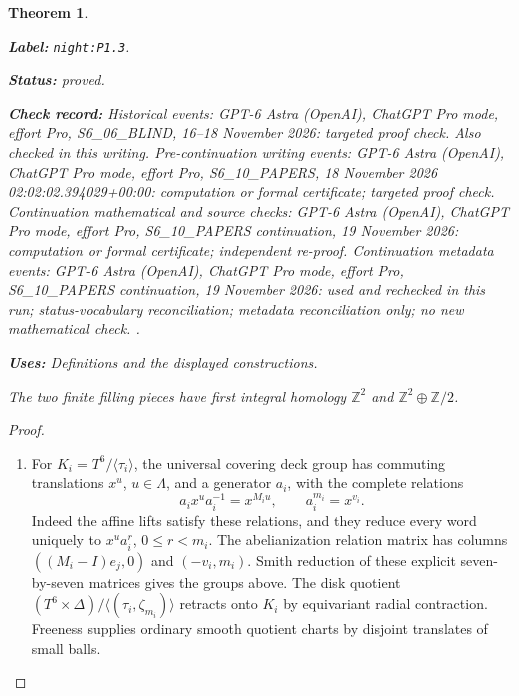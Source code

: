 \documentclass[11pt,a4paper]{article}
\newtheorem{theorem}{Theorem}[section]
\theoremstyle{definition}
\newcommand{\StatementRecord}[4]{\par\smallskip\begingroup\upshape\raggedright\noindent\textbf{Label:} \nolinkurl{#1}.\par\noindent\textbf{Status:} #2.\par\noindent\textbf{Check record:} #3.\par\noindent\textbf{Uses:} #4.\par\endgroup\smallskip}
\begin{document}
\begin{theorem}\label{night:P1.3}
\StatementRecord{night:P1.3}{proved}{Historical events: GPT-6 Astra (OpenAI), ChatGPT Pro mode, effort Pro, S6\_06\_BLIND, 16--18 November 2026: targeted proof check. Also checked in this writing. Pre-continuation writing events: GPT-6 Astra (OpenAI), ChatGPT Pro mode, effort Pro, S6\_10\_PAPERS, 18 November 2026 02:02:02.394029+00:00: computation or formal certificate; targeted proof check. Continuation mathematical and source checks: GPT-6 Astra (OpenAI), ChatGPT Pro mode, effort Pro, S6\_10\_PAPERS continuation, 19 November 2026: computation or formal certificate; independent re-proof. Continuation metadata events: GPT-6 Astra (OpenAI), ChatGPT Pro mode, effort Pro, S6\_10\_PAPERS continuation, 19 November 2026: used and rechecked in this run; status-vocabulary reconciliation; metadata reconciliation only; no new mathematical check. }{Definitions and the displayed constructions}
The two finite filling pieces have first integral homology
$\mathbb Z^2$ and $\mathbb Z^2\oplus\mathbb Z/2$.
\end{theorem}
\begin{proof}
\begin{enumerate}[label=\arabic*.]
\item For $K_i=T^6/\langle\tau_i\rangle$, the universal covering deck group
has commuting translations $x^u$, $u\in\Lambda$, and a generator $a_i$,
with the complete relations
\[
a_ix^ua_i^{-1}=x^{M_iu},\qquad a_i^{m_i}=x^{v_i}.
\]
Indeed the affine lifts satisfy these relations, and they reduce every
word uniquely to $x^ua_i^r$, $0\leq r<m_i$.
The abelianization relation matrix has columns
$((M_i-I)e_j,0)$ and $(-v_i,m_i)$.
Smith reduction of these explicit seven-by-seven matrices gives the
groups above.  The disk quotient
$(T^6\times\Delta)/\langle(\tau_i,\zeta_{m_i})\rangle$
retracts onto $K_i$ by equivariant radial contraction.  Freeness supplies
ordinary smooth quotient charts by disjoint translates of small balls.

\end{enumerate}
\end{proof}
\end{document}
